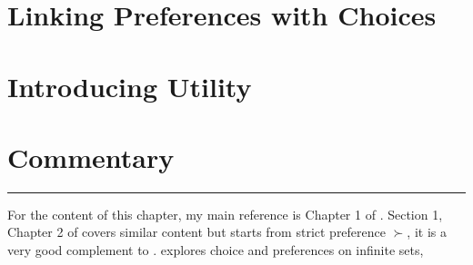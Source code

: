 \section{Linking Preferences with Choices}\label{chap1:sec3}


\section{Introducing Utility}\label{chap1:sec4}


\section{Commentary}\label{chap1:sec5}


\vspace{0.5cm}
\noindent\rule{\textwidth}{0.4pt}

For the content of this chapter, my main reference is Chapter 1 of \citet{mas1995microeconomic}. Section 1, Chapter 2 of \citet{kreps1990acourse} covers similar content but starts from strict preference $\succ$, it is a very
good complement to \citet{mas1995microeconomic}. \citet{kreps2013microeconomic} explores choice and preferences on infinite sets, 